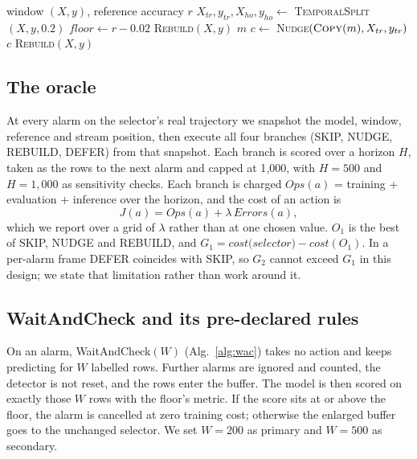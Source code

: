 \documentclass[conference]{IEEEtran}
\begin{document}
\begin{algorithm}[t]
\caption{\textsc{MechanismSelector.adapt} at one alarm}
\label{alg:selector}
\small
\begin{algorithmic}[1]
\Require window $(X,y)$, reference accuracy $r$
\State $X_{tr},y_{tr},X_{ho},y_{ho} \gets$ \textsc{TemporalSplit}$(X,y,0.2)$
\State $\textit{floor} \gets r - 0.02$
  \State \Return \textsc{Rebuild}$(X,y)$ 
\EndIf
{}
  \State \Return $m$ 
\EndIf
\State $c \gets$ \textsc{Nudge}$(\textsc{Copy}(m),X_{tr},y_{tr})$
  \State \Return $c$ 
\EndIf
\State \Return \textsc{Rebuild}$(X,y)$ 
\end{algorithmic}
\end{algorithm}

\subsection{The oracle}

At every alarm on the selector's real trajectory we snapshot the model, window,
reference and stream position, then execute all four branches (SKIP, NUDGE,
REBUILD, DEFER) from that snapshot. Each branch is scored over a horizon $H$,
taken as the rows to the next alarm and capped at 1{,}000, with $H=500$ and
$H=1{,}000$ as sensitivity checks. Each branch is charged
$\textit{Ops}(a)$ = training + evaluation + inference over the horizon, and the
cost of an action is
\begin{equation}
J(a) = \textit{Ops}(a) + \lambda\,\textit{Errors}(a),
\end{equation}
which we report over a grid of $\lambda$ rather than at one chosen value. $O_1$
is the best of SKIP, NUDGE and REBUILD, and $G_1 = \textit{cost(selector)} -
\textit{cost}(O_1)$. In a per-alarm frame DEFER coincides with SKIP, so $G_2$
cannot exceed $G_1$ in this design; we state that limitation rather than work
around it.

\subsection{WaitAndCheck and its pre-declared rules}

On an alarm, WaitAndCheck$(W)$ (Alg.~\ref{alg:wac}) takes no action and keeps
predicting for $W$ labelled rows. Further alarms are ignored and counted, the
detector is not reset, and the rows enter the buffer. The model is then scored on
exactly those $W$ rows with the floor's metric. If the score sits at or above the
floor, the alarm is cancelled at zero training cost; otherwise the enlarged
buffer goes to the unchanged selector. We set $W=200$ as primary and $W=500$ as
secondary.
\end{document}
